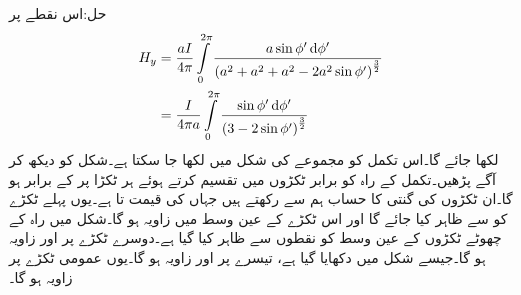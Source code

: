 حل:اس نقطے پر 
\begin{align*}
H_y&=\frac{aI}{4\pi}\int\limits_0^{2\pi} \frac{a\sin \phi' \dif \phi'}{\left(a^2+a^2+a^2-2 a^2\sin \phi'\right)^{\frac{3}{2}}}\\
&=\frac{I}{4\pi a}\int\limits_0^{2\pi} \frac{\sin \phi' \dif \phi'}{\left(3-2\sin \phi'\right)^{\frac{3}{2}}}
\end{align*}
لکھا جائے گا۔اس تکمل کو مجموعے کی شکل میں لکھا جا سکتا ہے۔شکل  کو دیکھ کر آگے پڑھیں۔تکمل کے راہ کو  برابر ٹکڑوں میں تقسیم کرتے  ہوئے ہر ٹکڑا پر  کے برابر ہو گا۔ان ٹکڑوں کی گنتی کا حساب ہم  سے رکھتے ہیں جہاں  کی قیمت  تا  ہے۔یوں پہلے ٹکڑے کو  سے ظاہر کیا جائے گا اور اس ٹکڑے کے عین وسط میں زاویہ  ہو گا۔شکل میں راہ کے چھوٹے ٹکڑوں کے عین وسط کو نقطوں سے ظاہر کیا گیا ہے۔دوسرے ٹکڑے پر  اور زاویہ  ہو گا۔جیسے شکل میں دکھایا گیا ہے، تیسرے پر  اور زاویہ   ہو گا۔یوں عمومی ٹکڑے  پر زاویہ
  ہو گا۔

